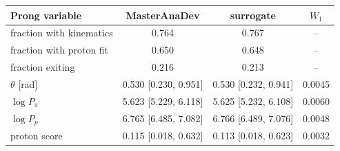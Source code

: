 \begin{tabular}{lccc}
\toprule
Prong variable & MasterAnaDev & surrogate & $W_1$ \\
\midrule
fraction with kinematics & 0.764 & 0.767 & -- \\
fraction with proton fit & 0.650 & 0.648 & -- \\
fraction exiting & 0.216 & 0.213 & -- \\
$\theta$ [rad] & 0.530 [0.230, 0.951] & 0.530 [0.232, 0.941] & 0.0045 \\
$\log P_\pi$ & 5.623 [5.229, 6.118] & 5.625 [5.232, 6.108] & 0.0060 \\
$\log P_p$ & 6.765 [6.485, 7.082] & 6.766 [6.489, 7.076] & 0.0048 \\
proton score & 0.115 [0.018, 0.632] & 0.113 [0.018, 0.623] & 0.0032 \\
\bottomrule
\end{tabular}
